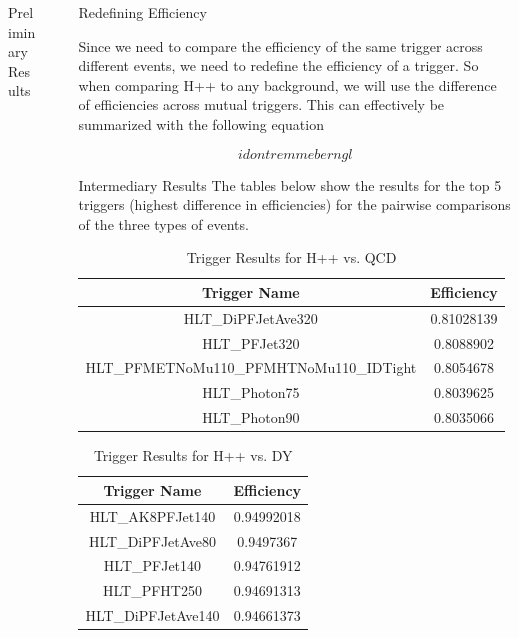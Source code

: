 \documentclass{beamer}
\newlength{\sepwidth}
\newlength{\colwidth}
\newcommand{\separatorcolumn}{\begin{column}{\sepwidth}\end{column}}
\begin{document}
\begin{frame}[t]
\begin{columns}[t]
\begin{column}{\colwidth}
\begin{block}{Preliminary Results}
  \end{block}

\end{column}

\separatorcolumn

\begin{column}{\colwidth}

  \begin{block}{Redefining Efficiency}

    Since we need to compare the efficiency of the same trigger across different events, we need to redefine the efficiency of a trigger. So when comparing H++ to any background, we will use the difference of efficiencies across mutual triggers. This can effectively be summarized with the following equation 

    $$i dont remmeber ngl$$
    
  \end{block}

  \begin{block}{Intermediary Results}
    The tables below show the results for the top 5 triggers (highest difference in efficiencies) for the pairwise comparisons of the three types of events.
    \begin{table}[h!]
      \caption{\label{table:4}Trigger Results for H++ vs. QCD}
          \begin{tabular}[t]{c|c}
              \hline
              \textbf{Trigger Name} & \textbf{Efficiency}\\
              \hline
              HLT\_DiPFJetAve320 & 0.81028139\\
              HLT\_PFJet320 & 0.8088902\\
              HLT\_PFMETNoMu110\_PFMHTNoMu110\_IDTight & 0.8054678 \\
              HLT\_Photon75 & 0.8039625 \\
              HLT\_Photon90 & 0.8035066 
          \end{tabular}
    \end{table}

    \begin{table}[h!]
      \caption{\label{table:5}Trigger Results for H++ vs. DY}
          \begin{tabular}[t]{c|c}
              \hline
              \textbf{Trigger Name} & \textbf{Efficiency}\\
              \hline
              HLT\_AK8PFJet140 & 0.94992018\\
              HLT\_DiPFJetAve80 & 0.9497367\\
              HLT\_PFJet140 & 0.94761912 \\
              HLT\_PFHT250 & 0.94691313 \\
              HLT\_DiPFJetAve140 & 0.94661373
          \end{tabular}
    \end{table}
  \end{block}


\end{column}
\end{columns}
\end{frame}
\end{document}
